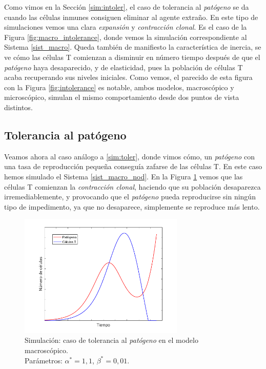 Como vimos en la Sección \ref{sim:intoler}, el caso de tolerancia al \textit{patógeno} se da cuando las células inmunes consiguen eliminar al agente extraño. En este tipo de simulaciones vemos una clara \textit{expansión} y \textit{contracción clonal}. Es el caso de la Figura \ref{fig:macro_intolerance}, donde vemos la simulación correspondiente al Sistema \ref{sist_macro}. Queda también de manifiesto la característica de inercia, se ve cómo las células T comienzan a disminuir en número tiempo después de que el \textit{patógeno} haya desaparecido, y de elasticidad, pues la población de células T acaba recuperando sus niveles iniciales. Como vemos, el parecido de esta figura con la Figura \ref{fig:intolerance} es notable, ambos modelos, macroscópico y microscópico, simulan el mismo comportamiento desde dos puntos de vista distintos.

\subsection{Tolerancia al patógeno}

Veamos ahora al caso análogo a \ref{sim:toler}, donde vimos cómo, un \textit{patógeno} con una tasa de reproducción pequeña conseguía zafarse de las células T. En este caso hemos simulado el Sistema \ref{sist_macro_nod}. En la Figura \ref{fig:macro_tolerance} vemos que las células T comienzan la \textit{contracción clonal}, haciendo que su población desaparezca irremediablemente, y provocando que el \textit{patógeno} pueda reproducirse sin ningún tipo de impedimento, ya que no desaparece, simplemente se reproduce más lento.

\begin{figure}[t]
	\centering
	\includegraphics[width=0.7\textwidth]{Imagenes/Simulaciones/macro_toler}
	\caption{Simulación: caso de tolerancia al \textit{patógeno} en el modelo macroscópico.\\Parámetros: $\alpha^{*}=1,1$, $\beta^{*}=0,01$.}
	\label{fig:macro_tolerance}
\end{figure}


